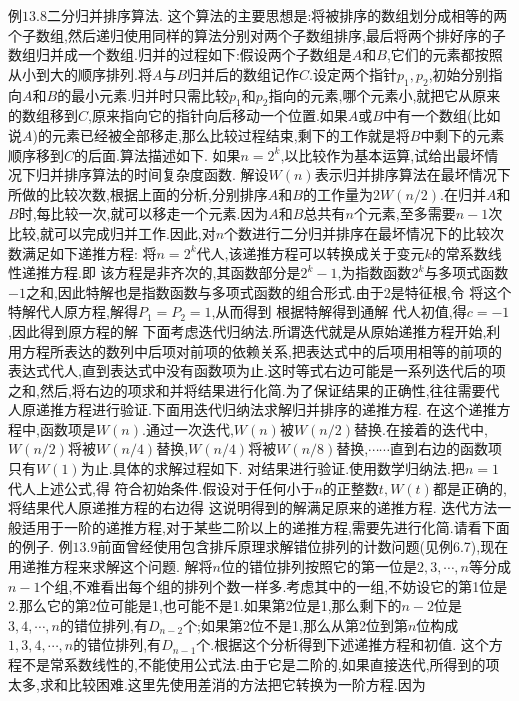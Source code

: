 {例$13.8$二分归并排序算法.}
这个算法的主要思想是:将被排序的数组划分成相等的两个子数组,然后递归使用同样的算法分别对两个子数组排序,最后将两个排好序的子数组归并成一个数组.归并的过程如下:假设两个子数组是$A$和$B$,它们的元素都按照从小到大的顺序排列.将$A$与$B$归并后的数组记作$C$.设定两个指针$p_{1},p_{2}$,初始分别指向$A$和$B$的最小元素.归并时只需比较$p_{1}$和$p_{2}$指向的元素,哪个元素小,就把它从原来的数组移到$C$,原来指向它的指针向后移动一个位置.如果$A$或$B$中有一个数组(比如说$A$)的元素已经被全部移走,那么比较过程结束,剩下的工作就是将$B$中剩下的元素顺序移到$C$的后面.算法描述如下.
如果$n=2^{k}$,以比较作为基本运算,试给出最坏情况下归并排序算法的时间复杂度函数.
解设$W(n)$表示归并排序算法在最坏情况下所做的比较次数,根据上面的分析,分别排序$A$和$B$的工作量为$2W(n/2)$.在归并$A$和$B$时,每比较一次,就可以移走一个元素.因为$A$和$B$总共有$n$个元素,至多需要$n-1$次比较,就可以完成归并工作.因此,对$n$个数进行二分归并排序在最坏情况下的比较次数满足如下递推方程:
将$n=2^{k}$代人,该递推方程可以转换成关于变元$k$的常系数线性递推方程.即
该方程是非齐次的,其函数部分是$2^{k}-1$,为指数函数$2^{k}$与多项式函数$-1$之和,因此特解也是指数函数与多项式函数的组合形式.由于2是特征根,令
将这个特解代人原方程,解得$P_{1}=P_{2}=1$,从而得到
根据特解得到通解
代人初值,得$c=-1$,因此得到原方程的解
下面考虑迭代归纳法.所谓迭代就是从原始递推方程开始,利用方程所表达的数列中后项对前项的依赖关系,把表达式中的后项用相等的前项的表达式代人,直到表达式中没有函数项为止.这时等式右边可能是一系列迭代后的项之和,然后,将右边的项求和并将结果进行化简.为了保证结果的正确性,往往需要代人原递推方程进行验证.下面用迭代归纳法求解归并排序的递推方程.
在这个递推方程中,函数项是$W(n)$.通过一次迭代,$W(n)$被$W(n/2)$替换.在接着的迭代中,$W(n/2)$将被$W(n/4)$替换,$W(n/4)$将被$W(n/8)$替换,$\cdots\cdots$直到右边的函数项只有$W(1)$为止.具体的求解过程如下.
对结果进行验证.使用数学归纳法.把$n=1$代人上述公式,得
符合初始条件.假设对于任何小于$n$的正整数$t,W(t)$都是正确的,将结果代人原递推方程的右边得
这说明得到的解满足原来的递推方程.
迭代方法一般适用于一阶的递推方程,对于某些二阶以上的递推方程,需要先进行化简.请看下面的例子.
例$13.9$前面曾经使用包含排斥原理求解错位排列的计数问题(见例6.7),现在用递推方程来求解这个问题.
解将$n$位的错位排列按照它的第一位是$2,3,\cdots,n$等分成$n-1$个组,不难看出每个组的排列个数一样多.考虑其中的一组,不妨设它的第1位是2.那么它的第2位可能是1,也可能不是1.如果第2位是1,那么剩下的$n-2$位是$3,4,\cdots,n$的错位排列,有$D_{n-2}$个;如果第2位不是1,那么从第2位到第$n$位构成$1,3,4,\cdots,n$的错位排列,有$D_{n-1}$个.根据这个分析得到下述递推方程和初值.
这个方程不是常系数线性的,不能使用公式法.由于它是二阶的,如果直接迭代,所得到的项太多,求和比较困难.这里先使用差消的方法把它转换为一阶方程.因为
